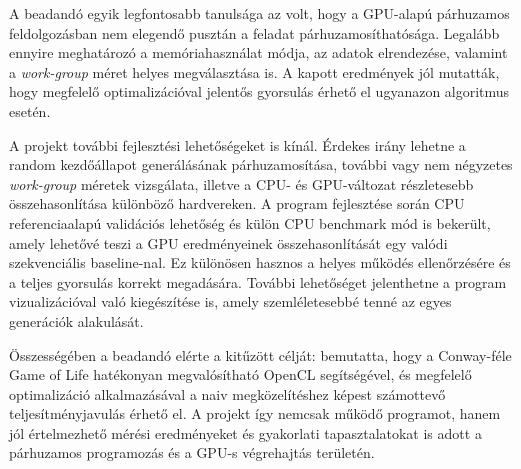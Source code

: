\documentclass[12pt,a4paper]{article}
\begin{document}
A beadandó egyik legfontosabb tanulsága az volt, hogy a GPU-alapú párhuzamos feldolgozásban nem elegendő pusztán a feladat párhuzamosíthatósága. Legalább ennyire meghatározó a memóriahasználat módja, az adatok elrendezése, valamint a \emph{work-group} méret helyes megválasztása is. A kapott eredmények jól mutatták, hogy megfelelő optimalizációval jelentős gyorsulás érhető el ugyanazon algoritmus esetén.

A projekt további fejlesztési lehetőségeket is kínál. Érdekes irány lehetne a random kezdőállapot generálásának párhuzamosítása, további vagy nem négyzetes \emph{work-group} méretek vizsgálata, illetve a CPU- és GPU-változat részletesebb összehasonlítása különböző hardvereken. A program fejlesztése során CPU referenciaalapú validációs lehetőség és külön CPU benchmark mód is bekerült, amely lehetővé teszi a GPU eredményeinek összehasonlítását egy valódi szekvenciális baseline-nal. Ez különösen hasznos a helyes működés ellenőrzésére és a teljes gyorsulás korrekt megadására. További lehetőséget jelenthetne a program vizualizációval való kiegészítése is, amely szemléletesebbé tenné az egyes generációk alakulását.

Összességében a beadandó elérte a kitűzött célját: bemutatta, hogy a Conway-féle Game of Life hatékonyan megvalósítható OpenCL segítségével, és megfelelő optimalizáció alkalmazásával a naiv megközelítéshez képest számottevő teljesítményjavulás érhető el. A projekt így nemcsak működő programot, hanem jól értelmezhető mérési eredményeket és gyakorlati tapasztalatokat is adott a párhuzamos programozás és a GPU-s végrehajtás területén.
\end{document}
